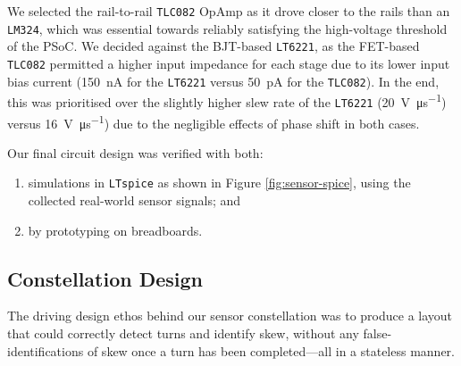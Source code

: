 \documentclass[conference]{IEEEtran}
\begin{document}
We selected the rail-to-rail \texttt{TLC082} OpAmp as it drove closer to the rails than an \texttt{LM324}, which was essential towards reliably satisfying the high-voltage threshold of the PSoC. We decided against the BJT-based \texttt{LT6221}, as the FET-based \texttt{TLC082} permitted a higher input impedance for each stage due to its lower input bias current (\qty{150}{\nA} for the \texttt{LT6221} versus \qty{50}{\pA} for the \texttt{TLC082}).
In the end, this was prioritised over the slightly higher slew rate of the \texttt{LT6221} (\qty{20}{\volt\per\us}) versus \qty{16}{\volt\per\us}) due to the negligible effects of phase shift in both cases.

Our final circuit design was verified with both:
\begin{enumerate}
	\item simulations in \texttt{LTspice} as shown in Figure \ref{fig:sensor-spice}, using the collected real-world sensor signals; and
	\item by prototyping on breadboards.
\end{enumerate}

\subsection{Constellation Design}

The driving design ethos behind our sensor constellation was to produce a layout that could correctly detect turns and identify skew, without any false-identifications of skew once a turn has been completed—all in a stateless manner.
\end{document}
